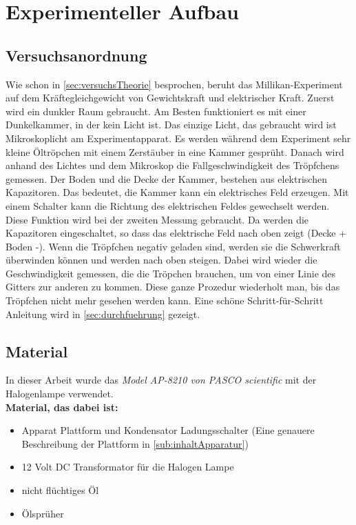 \chapter{Experimenteller Aufbau}\label{cha:experimentAufbau}
\section{Versuchsanordnung}\label{sec:versuchsanordnung}

Wie schon in \autoref{sec:versuchsTheorie} besprochen, beruht das Millikan-Experiment auf dem Kräftegleichgewicht von Gewichtskraft und elektrischer Kraft. Zuerst wird ein dunkler Raum gebraucht. Am Besten funktioniert es mit einer Dunkelkammer, in der kein Licht ist. Das einzige Licht, das gebraucht wird ist Mikroskoplicht am Experimentapparat. Es werden während dem Experiment sehr kleine Öltröpchen mit einem Zerstäuber in eine Kammer gesprüht. Danach wird anhand des Lichtes und dem Mikroskop die Fallgeschwindigkeit des Tröpfchens gemessen. Der Boden und die Decke der Kammer, bestehen aus elektrischen Kapazitoren. Das bedeutet, die Kammer kann ein elektrisches Feld erzeugen. Mit einem Schalter kann die Richtung des elektrischen Feldes gewechselt werden. Diese Funktion wird bei der zweiten Messung gebraucht. Da werden die Kapazitoren eingeschaltet, so dass das elektrische Feld nach oben zeigt (Decke + Boden -). Wenn die Tröpfchen negativ geladen sind, werden sie die Schwerkraft überwinden können und werden nach oben steigen. Dabei wird wieder die Geschwindigkeit gemessen, die die Tröpchen brauchen, um von einer Linie des Gitters zur anderen zu kommen. Diese ganze Prozedur wiederholt man, bis das Tröpfchen nicht mehr gesehen werden kann. Eine schöne Schritt-für-Schritt Anleitung wird in \autoref{sec:durchfuehrung} gezeigt.

\section{Material}\label{sec:material}

In dieser Arbeit wurde das \textit{Model AP-8210 von PASCO scientific} mit der Halogenlampe verwendet. \\

\noindent \textbf{Material, das dabei ist:}

\begin{itemize}
	\item Apparat Plattform und Kondensator Ladungsschalter (Eine genauere Beschreibung der Plattform in \autoref{sub:inhaltApparatur})
	\item 12 Volt DC Transformator für die Halogen Lampe
	\item nicht flüchtiges Öl
	\item Ölsprüher 
\end{itemize}

